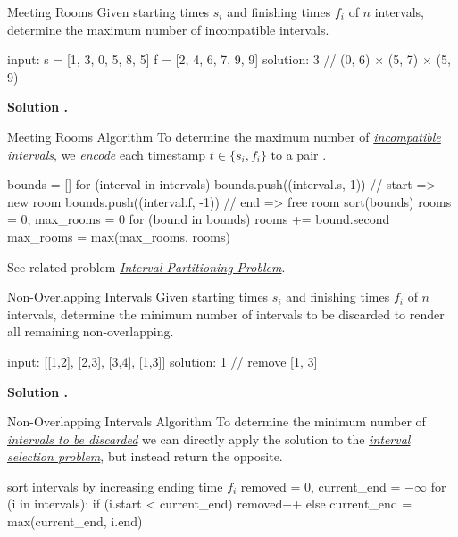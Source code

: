 \documentclass{cognito}
\begin{document}
\begin{note}{Meeting Rooms}
	Given starting times $s_i$ and finishing times $f_i$ of $n$ intervals,
	determine the maximum number of incompatible intervals.
	\begin{largecode}
 input: s = [1, 3, 0, 5, 8, 5]
        f = [2, 4, 6, 7, 9, 9]
 solution: 3  // (0, 6) $\times$ (5, 7) $\times$ (5, 9)
	\end{largecode}
	\bf Solution \hyperref[note:Meeting Rooms Algorithm]{\solutionref}.
\end{note}

\begin{note}{Meeting Rooms Algorithm}
	To determine the maximum number of \hyperref[note:Meeting Rooms]{\it incompatible intervals},
	we {\it encode} each timestamp $t \in \{s_i, f_i\}$ to a pair .

	\begin{largecode}
 bounds = []
 for (interval in intervals)
 	bounds.push((interval.s, 1))  // start => new room
	bounds.push((interval.f, -1)) // end => free room
 sort(bounds)
 rooms = 0, max_rooms = 0
 for (bound in bounds)
 	rooms += bound.second
	max_rooms = max(max_rooms, rooms)
	\end{largecode}
	\begin{remark} See related problem \hyperref[note:Interval Partitioning Problem]{\it Interval Partitioning Problem}.
	\end{remark}
	\vspace{-5pt}
\end{note}

\begin{note}{Non-Overlapping Intervals}
	Given starting times $s_i$ and finishing times $f_i$ of $n$ intervals,
	determine the minimum number of intervals to be discarded to 
	render all remaining non-overlapping.
	
	\begin{largecode}
 input: [[1,2], [2,3], [3,4], [1,3]]
 solution: 1 // remove [1, 3]
	\end{largecode}
	\bf Solution \hyperref[note:Non-Overlapping Intervals Algorithm]{\solutionref}.
\end{note}

\begin{note}{Non-Overlapping Intervals Algorithm}
	To determine the minimum number of \hyperref[note:Non-Overlapping Intervals]{\it intervals to be discarded}
	we can directly apply the solution to the \hyperref[note:Interval Selection Problem]{\it interval selection problem},
	but instead return the opposite.
	
	\begin{largecode}
 sort intervals by increasing ending time $f_i$
 removed = 0, current_end = $-\infty$
 for (i in intervals):
 	if (i.start < current_end) removed++
	else current_end = max(current_end, i.end)
	\end{largecode}
	\vspace{-5pt}
\end{note}
\end{document}
